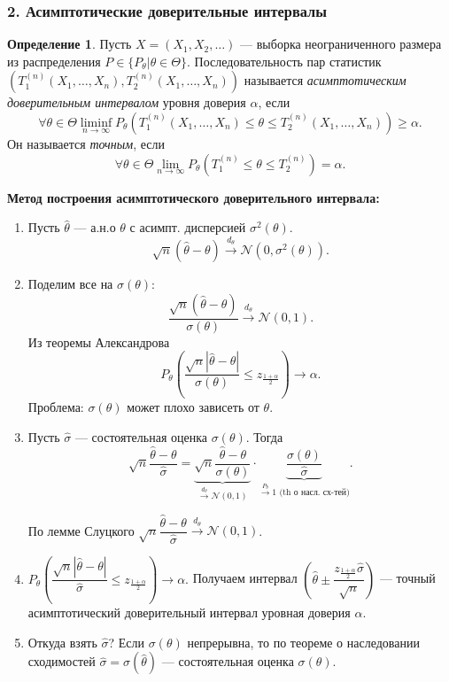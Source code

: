 \documentclass[12pt]{report}
\theoremstyle{definition}
\newtheorem{definition}{Определение}
\begin{document}
\subsubsection{2. Асимптотические доверительные интервалы}
\begin{definition}
	Пусть $X = (X_1, X_2, \dots)$ — выборка неограниченного размера из распределения $P \in \{P_\theta \vert \theta \in \Theta\}$. Последовательность пар статистик $(T_1^{(n)}(X_1, \dots, X_n), T_2^{(n)}(X_1, \dots, X_n))$ называется \emph{асимптотическим доверительным интервалом} уровня доверия $\alpha$, если  
	$$\forall \theta \in \Theta \liminf_{n \to\infty} P_\theta(T_1^{(n)}(X_1, \dots, X_n) \leqslant \theta \leqslant T_2^{(n)}(X_1, \dots, X_n)) \geqslant \alpha. $$ 
	Он называется \emph{точным}, если 
	$$\forall \theta \in \Theta \lim_{n\to\infty} P_\theta(T_1^{(n)}\leqslant \theta \leqslant T_2^{(n)}) = \alpha.$$

\end{definition}
\textbf{Метод построения асимптотического доверительного интервала:}
\begin{enumerate}
	\item Пусть $\widehat{\theta}$ — а.н.о $\theta$ с асимпт. дисперсией $\sigma^2(\theta)$.
   	$$\sqrt{n}(\widehat{\theta} - \theta) \xrightarrow{d_\theta} \mathcal{N}(0, \sigma^2(\theta)). $$
	\item Поделим все на $\sigma(\theta)$:
	$$\dfrac{\sqrt{n}(\widehat{\theta} - \theta)}{\sigma(\theta)} \xrightarrow{d_\theta} \mathcal{N}(0, 1). $$
	Из теоремы Александрова
	$$ P_\theta\left(\dfrac{\sqrt{n}|\widehat{\theta} - \theta|}{\sigma(\theta)} \leqslant z_{\frac{1+\alpha}{2}}\right) \rightarrow \alpha. $$
	Проблема: $\sigma(\theta)$ может плохо зависеть от $\theta$.
	\item Пусть $\widehat{\sigma}$ — состоятельная оценка $\sigma(\theta)$. Тогда
		$$ \sqrt{n}\dfrac{\widehat{\theta} - \theta}{\widehat{\sigma}} = \underbrace{\sqrt{n}\dfrac{\widehat{\theta} - \theta}{\sigma(\theta)}}_{\xrightarrow{d_\theta} \mathcal{N}(0,1)} \cdot \underbrace{\dfrac{\sigma(\theta)}{\widehat{\sigma}}}_{\xrightarrow{P_\theta} 1 \text{ (th о насл. сх-тей)}}. $$

		По лемме Слуцкого $\sqrt{n}\dfrac{\widehat{\theta} - \theta}{\widehat{\sigma}} \xrightarrow{d_\theta} \mathcal{N}(0, 1)$.
	\item $P_\theta\left(\dfrac{\sqrt{n}|\widehat{\theta} - \theta|}{\widehat{\sigma}} \leqslant z_{\frac{1+\alpha}{2}}\right) \rightarrow \alpha.$ Получаем интервал $\left(\widehat{\theta} \pm \dfrac{z_{\frac{1+\alpha}{2}} \widehat{\sigma}}{\sqrt{n}} \right)$ — точный асимптотический доверительный интервал уровная доверия $\alpha$.
	\item Откуда взять $\widehat{\sigma}$?  
	Если $\sigma(\theta)$ непрерывна, то по теореме о наследовании сходимостей $\widehat{\sigma} = \sigma(\widehat{\theta})$ — состоятельная оценка $\sigma(\theta)$.
\end{enumerate}
\end{document}
